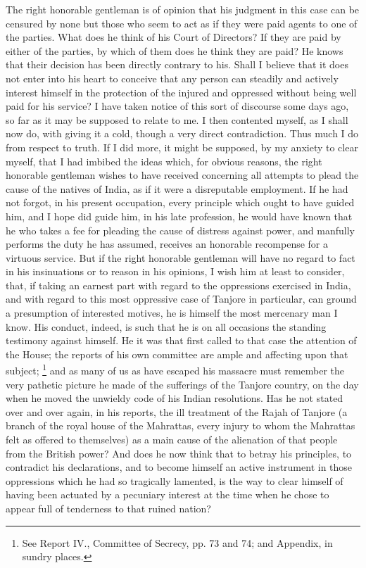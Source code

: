 The right honorable gentleman is of opinion that his judgment in this case can be censured by none but those who seem to act as if they were paid agents to one of the parties. What does he think of his Court of Directors? If they are paid by either of the parties, by which of them does he think they are paid? He knows that their decision has been directly contrary to his. Shall I believe that it does not enter into his heart to conceive that any person can steadily and actively interest himself in the protection of the injured and oppressed without being well paid for his service? I have taken notice of this sort of discourse some days ago, so far as it may be supposed to relate to me. I then contented myself, as I shall now do, with giving it a cold, though a very direct contradiction. Thus much I do from respect to truth. If I did more, it might be supposed, by my anxiety to clear myself, that I had imbibed the ideas which, for obvious reasons, the right honorable gentleman wishes to have received concerning all attempts to plead the cause of the natives of India, as if it were a disreputable employment. If he had not forgot, in his present occupation, every principle which ought to have guided him, and I hope did guide him, in his late profession, he would have known that he who takes a fee for pleading the cause of distress against power, and manfully performs the duty he has assumed, receives an honorable recompense for a virtuous service. But if the right honorable gentleman will have no regard to fact in his insinuations or to reason in his opinions, I wish him at least to consider, that, if taking an earnest part with regard to the oppressions exercised in India, and with regard to this most oppressive case of Tanjore in particular, can ground a presumption of interested motives, he is himself the most mercenary man I know. His conduct, indeed, is such that he is on all occasions the standing testimony against himself. He it was that first called to that case the attention of the House; the reports of his own committee are ample and affecting upon that subject;
\footnote{ See Report IV., Committee of Secrecy, pp. 73 and 74; and Appendix, in sundry places.}
 and as many of us as have escaped his massacre must remember the very pathetic picture he made of the sufferings of the Tanjore country, on the day when he moved the unwieldy code of his Indian resolutions. Has he not stated over and over again, in his reports, the ill treatment of the Rajah of Tanjore (a branch of the royal house of the Mahrattas, every injury to whom the Mahrattas felt as offered to themselves) as a main cause of the alienation of that people from the British power? And does he now think that to betray his principles, to contradict his declarations, and to become himself an active instrument in those oppressions which he had so tragically lamented, is the way to clear himself of having been actuated by a pecuniary interest at the time when he chose to appear full of tenderness to that ruined nation?

